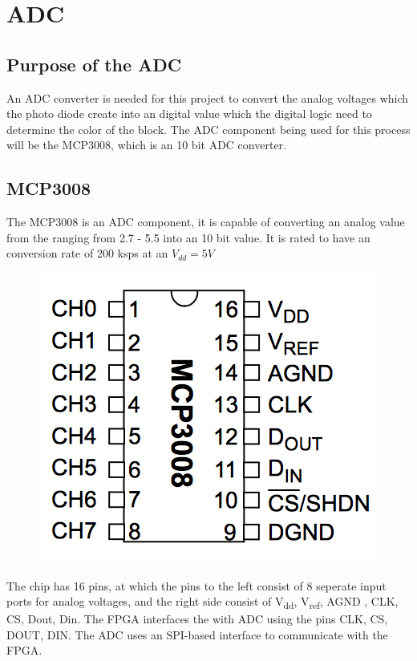 \section{ADC}
\subsection{Purpose of the ADC}
An ADC converter is needed for this project to convert the analog voltages which the photo diode create into an digital value which the digital logic need to determine the color of the block.   
The ADC component being used for this process will be the MCP3008, which is an 10 bit ADC converter.  
\subsection{MCP3008}
The MCP3008 is an ADC component, it is capable of converting an analog value from the ranging from 2.7 - 5.5 into an 10 bit value. It is rated to have an conversion rate of 200 ksps at an $V_{dd} = 5V$



\begin{figure}[H]
\center
\includegraphics[scale = 0.5]{images/MPC3008.png}
\caption{}
\end{figure}
The chip has 16 pins, at which the pins to the left consist of 8 seperate input ports for analog voltages, and the right side consist of V\textsubscript{dd}, V\textsubscript{ref}, AGND , CLK, CS, Dout,  Din.   The FPGA interfaces the with ADC using the pins CLK, CS, DOUT, DIN. 
The ADC uses an SPI-based interface to communicate with the FPGA. \\


